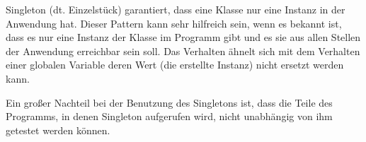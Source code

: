 Singleton (dt. Einzelstück) garantiert, dass eine Klasse nur eine Instanz in der Anwendung hat.
Dieser Pattern kann sehr hilfreich sein, wenn es bekannt ist, dass es nur eine Instanz der Klasse im Programm gibt 
und es sie aus allen Stellen der Anwendung erreichbar sein soll.
Das Verhalten ähnelt sich mit dem Verhalten einer 
globalen Variable deren Wert (die erstellte Instanz) nicht ersetzt werden kann.

Ein großer Nachteil bei der Benutzung des Singletons ist, 
dass die Teile des Programms, in denen Singleton aufgerufen wird, nicht unabhängig von ihm getestet werden können.